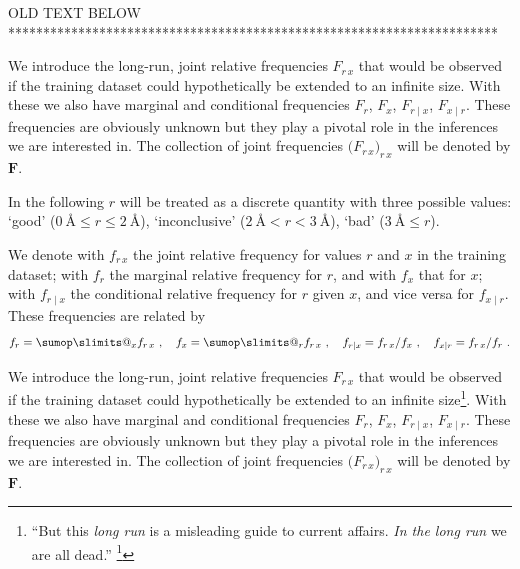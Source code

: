 \documentclass[\ifafour a4paper,12pt,\else a5paper,10pt,\fi%
onecolumn,oneside,article,%
british%
]{memoir}
\makeatletter
\theoremstyle{remark}
\theoremstyle{innote}
\def\sum{\DOTSI\sumop\slimits@}
\renewcommand*{\finalnamedelim}{\addspace\amp\space}
\newcommand*{\citep}{\footcites}
\newcommand*{\amp}{\&}
\renewcommand*{\le}{\leqslant}%
\renewcommand*{\|}[1][]{\nonscript\:#1\vert\nonscript\:\mathopen{}}
\renewcommand*{\=}{\TextOrMath\texteq\eq}
\newcommand*{\sect}{\S}%
\newcommand*{\wrench}{{\fontencoding{U}\fontfamily{fontawesomethree}\selectfont\symbol{114}}}
\newcommand{\mynote}[1]{ {\color{notecolour}#1}}
\newcommand*{\q}{}%
\DeclareRobustCommand*{\q}{%
  \mathord{\mathpalette\bigcdot@{}}%
}
\newcommand*{\bigcdot@scalefactor}{0.7}
\newcommand*{\bigcdot@widthfactor}{1.5}
\newcommand*{\bigcdot@}[2]{%
  \sbox0{$#1\vcenter{}$}%
  \sbox2{$#1\cdot\m@th$}%
  \hbox to \bigcdot@widthfactor\wd2{%
    \hfil
    \raise\ht0\hbox{%
      \scalebox{\bigcdot@scalefactor}{%
        \lower\ht0\hbox{$#1\bullet\m@th$}%
      }%
    }%
    \hfil
  }%
}
\newcommand*{\yF}{\bm{F}}
\makeatother
\begin{document}
\renewcommand*{\finalnamedelim}{\addcomma\space}

\printbibliography[prenote=prenote%
]

\clearpage
\mynote{\wrench OLD TEXT BELOW}\\
**********************************************************************



We introduce the long-run, joint relative frequencies $F_{r\,x}$ that would
be observed if the training dataset could hypothetically be extended to an
infinite size. With these we also have
marginal and conditional frequencies $F_{r\q}$, $F_{\q x}$, $F_{r\mid x}$,
$F_{x \mid r}$. These frequencies are obviously unknown but they play a
pivotal role in the inferences we are interested in. The collection of
joint frequencies $\bigl(F_{r\,x}\bigr)_{r\,x}$ will be denoted by $\yF$.


In the following $r$ will be treated as a discrete quantity with three
possible values: \enquote*{good}
($0\ \textrm{\AA}\le r \le 2\ \textrm{\AA}$), \enquote*{inconclusive}
($2\ \textrm{\AA} < r < 3\ \textrm{\AA}$), \enquote*{bad}
($3\ \textrm{\AA} \le r$).

We denote with $f_{r\, x}$ the joint relative frequency for values $r$ and
$x$ in the training dataset; with $f_{r\q}$ the marginal relative frequency
for $r$, and with $f_{\q x}$ that for $x$; with $f_{r\mid x}$ the
conditional relative frequency for $r$ given $x$, and vice versa for
$f_{x \mid r}$. These frequencies are related by
\begin{equation}
  \label{eq:frequencies_relations}
  f_{r\q}=\sum_{x} f_{r\,x}\ , \quad
  f_{\q x}=\sum_{r} f_{r\,x}\ ,\quad
  f_{r\mid x}=f_{r\,x}/f_{\q x}\ , \quad
  f_{x\mid r}=f_{r\,x}/f_{r\q}\ .
\end{equation}

We introduce the long-run, joint relative frequencies $F_{r\,x}$ that would
be observed if the training dataset could hypothetically be extended to an
infinite size\footnote{\enquote{But this \emph{long run} is a misleading
    guide to current affairs. \emph{In the long run} we are all dead.}
  \citep[\sect~3.I, p.~65]{keynes1923_r2013}}. With these we also have
marginal and conditional frequencies $F_{r\q}$, $F_{\q x}$, $F_{r\mid x}$,
$F_{x \mid r}$. These frequencies are obviously unknown but they play a
pivotal role in the inferences we are interested in. The collection of
joint frequencies $\bigl(F_{r\,x}\bigr)_{r\,x}$ will be denoted by $\yF$.
\end{document}
